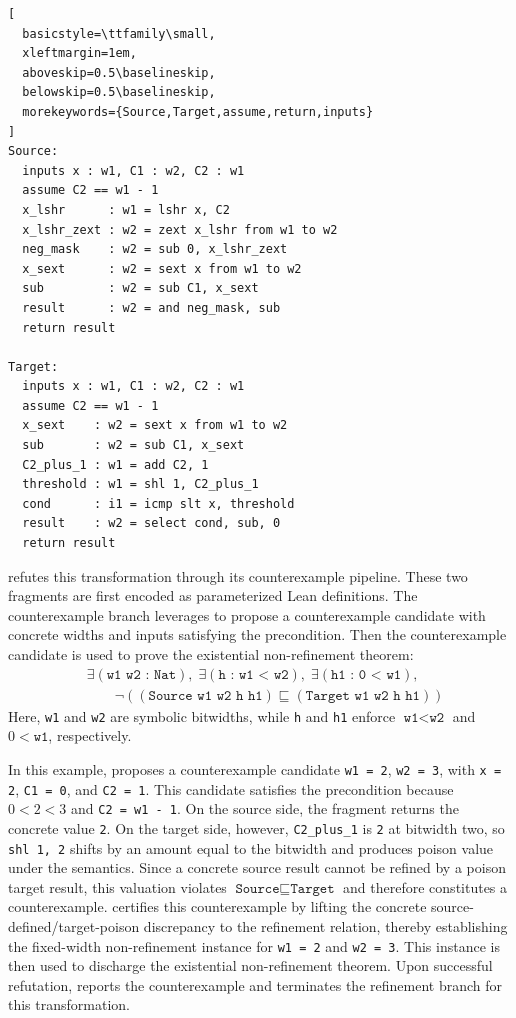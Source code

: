 \begin{lstlisting}[
  basicstyle=\ttfamily\small,
  xleftmargin=1em,
  aboveskip=0.5\baselineskip,
  belowskip=0.5\baselineskip,
  morekeywords={Source,Target,assume,return,inputs}
]
Source:
  inputs x : w1, C1 : w2, C2 : w1
  assume C2 == w1 - 1
  x_lshr      : w1 = lshr x, C2
  x_lshr_zext : w2 = zext x_lshr from w1 to w2
  neg_mask    : w2 = sub 0, x_lshr_zext
  x_sext      : w2 = sext x from w1 to w2
  sub         : w2 = sub C1, x_sext
  result      : w2 = and neg_mask, sub
  return result

Target:
  inputs x : w1, C1 : w2, C2 : w1
  assume C2 == w1 - 1
  x_sext    : w2 = sext x from w1 to w2
  sub       : w2 = sub C1, x_sext
  C2_plus_1 : w1 = add C2, 1
  threshold : w1 = shl 1, C2_plus_1
  cond      : i1 = icmp slt x, threshold
  result    : w2 = select cond, sub, 0
  return result
\end{lstlisting}

\proj refutes this transformation through its counterexample pipeline.
These two fragments are first encoded as parameterized Lean
definitions. The counterexample branch leverages \llm to propose a
counterexample candidate with concrete widths and inputs satisfying
the precondition. Then the counterexample candidate is used to prove the
existential non-refinement theorem:
\[
\begin{aligned}
&\exists (\texttt{w1 w2 : Nat}),\;
  \exists (\texttt{h : w1 < w2}),\;
  \exists (\texttt{h1 : 0 < w1}),\\
&\qquad
  \neg((\texttt{Source w1 w2 h h1}) \sqsubseteq
       (\texttt{Target w1 w2 h h1}))
\end{aligned}
\]
Here, \texttt{w1} and \texttt{w2} are symbolic bitwidths, while
\texttt{h} and \texttt{h1} enforce \(\texttt{w1} < \texttt{w2}\)
and \(0 < \texttt{w1}\), respectively.

In this example,
\proj proposes a counterexample candidate \texttt{w1 = 2},
\texttt{w2 = 3}, with \texttt{x = 2}, \texttt{C1 = 0}, and \texttt{C2 = 1}.
This candidate satisfies the precondition because $0 < 2 < 3$ and
\texttt{C2 = w1 - 1}. On the source side, the fragment returns
the concrete value \texttt{2}. On the target side, however,
\texttt{C2\_plus\_1} is \texttt{2} at bitwidth two, so
\texttt{shl 1, 2} shifts by an amount equal to the bitwidth
and produces poison value under the \llvm semantics.
Since a concrete source result cannot be refined by a poison
target result, this valuation violates \(\texttt{Source} \sqsubseteq \texttt{Target}\)
and therefore constitutes a counterexample. \proj certifies this
counterexample by lifting the concrete source-defined/target-poison
discrepancy to the \llvm refinement relation, thereby establishing
the fixed-width non-refinement instance for \texttt{w1 = 2} and
\texttt{w2 = 3}. This instance is then used to discharge the
existential non-refinement theorem.
Upon successful refutation, \proj reports the counterexample
and terminates the refinement branch for this transformation.
